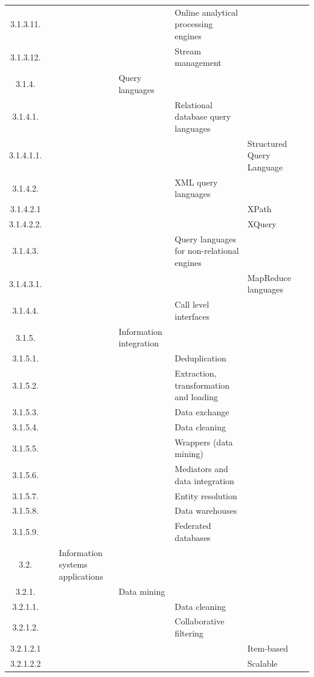 \documentclass[12pt]{article}
\begin{document}
\begin{center}
{\begin{tabularx}{\linewidth}{|c|X|X|X|X|X|X|}
		3.1.3.11. &   &   &   &  Online analytical processing engines &   &   \\
		3.1.3.12. &   &   &   &  Stream management &   &   \\
		3.1.4. &   &   &  Query languages &   &   &   \\
		3.1.4.1. &   &   &   &  Relational database query languages &   &   \\
		3.1.4.1.1. &   &   &   &   &  Structured Query Language &   \\
		3.1.4.2. &   &   &   &  XML query languages &   &   \\
		3.1.4.2.1 &   &   &   &   &  XPath &   \\
		3.1.4.2.2. &   &   &   &   &  XQuery &   \\
		3.1.4.3. &   &   &   &  Query languages for non-relational engines &   &   \\
		3.1.4.3.1. &   &   &   &   &  MapReduce languages &   \\
		3.1.4.4. &   &   &   &  Call level interfaces &   &   \\
		3.1.5. &   &   &  Information integration &   &   &   \\
		3.1.5.1. &   &   &   &  Deduplication &   &   \\
		3.1.5.2. &   &   &   &  Extraction, transformation and loading &   &   \\
		3.1.5.3. &   &   &   &  Data exchange &   &   \\
		3.1.5.4. &   &   &   &  Data cleaning &   &   \\
		3.1.5.5. &   &   &   &  Wrappers (data mining) &   &   \\
		3.1.5.6. &   &   &   &  Mediators and data integration &   &   \\
		3.1.5.7. &   &   &   &  Entity resolution &   &   \\
		3.1.5.8. &   &   &   &  Data warehouses &   &   \\
		3.1.5.9. &   &   &   &  Federated databases &   &   \\
		3.2. &   &  Information systems applications &   &   &   &   \\
		3.2.1. &   &   &  Data mining &   &   &   \\
		3.2.1.1. &   &   &   &  Data cleaning &   &   \\
		3.2.1.2. &   &   &   &  Collaborative filtering &   &   \\
		3.2.1.2.1 &   &   &   &   &  Item-based &   \\
		3.2.1.2.2 &   &   &   &   &  Scalable &   \\

\end{tabularx}}
\end{center}
\end{document}
